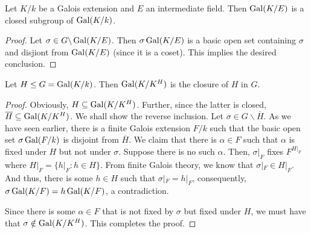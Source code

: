 \begin{proposition}
    Let $K/k$ be a Galois extension and $E$ an intermediate field. Then $\operatorname{Gal}(K/E)$ is a closed subgroup of $\operatorname{Gal}(K/k)$.
\end{proposition}
\begin{proof}
    Let $\sigma\in G\backslash\operatorname{Gal}(K/E)$. Then $\sigma\operatorname{Gal}(K/E)$ is a basic open set containing $\sigma$ and disjiont from $\operatorname{Gal}(K/E)$ (since it is a coset). This implies the desired conclusion.
\end{proof}

\begin{proposition}
    Let $H\le G = \operatorname{Gal}(K/k)$. Then $\operatorname{Gal}(K/K^H)$ is the closure of $H$ in $G$.
\end{proposition}
\begin{proof}
    Obviously, $H\subseteq\operatorname{Gal}(K/K^H)$. Further, since the latter is closed, $\overline{H}\subseteq\operatorname{Gal}(K/K^H)$. We shall show the reverse inclusion. Let $\sigma\in G\backslash\overline H$. As we have seen earlier, there is a finite Galois extension $F/k$ such that the basic open set $\sigma\operatorname{Gal}(F/k)$ is disjoint from $\overline H$. We claim that there is $\alpha\in F$ such that $\alpha$ is fixed under $H$ but not under $\sigma$. Suppose there is no such $\alpha$. Then, $\sigma|_F$ fixes $F^{H\vert_F}$ where $H\vert_F = \{h\vert_F : h\in H\}$. From finite Galois theory, we know that $\sigma|_F\in H|_F$. And thus, there is some $h\in H$ such that $\sigma|_F = h|_F$, consequently, $\sigma\operatorname{Gal}(K/F) = h\operatorname{Gal}(K/F)$, a contradiction. 

    Since there is some $\alpha\in F$ that is not fixed by $\sigma$ but fixed under $H$, we must have that $\sigma\notin\operatorname{Gal}(K/K^H)$. This completes the proof.
\end{proof}